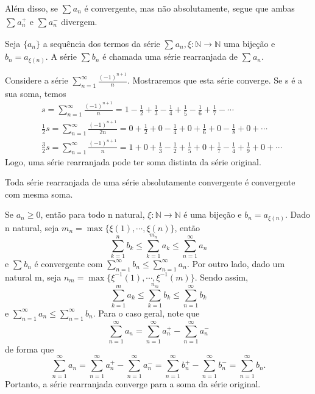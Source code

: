 \documentclass[analysis_notes.tex]{subfiles}
\begin{document}
Al\'em disso, se $\sum\limits_{}^{}a_{n}$ \'e convergente, mas n\~ao absolutamente, segue que ambas $\sum\limits_{}^{}a_{n}^{+}$ e $\sum\limits_{}^{}a_{n}^{-}$ divergem.
\begin{def*}
	Seja $\{a_{n}\}$ a sequ\^encia dos termos da s\'erie $\sum\limits_{}^{}a_{n}, \xi:\mathbb{N}\rightarrow \mathbb{N}$
	uma bije\c c\~ao e $b_{n} = a_{\xi(n)}.$ A s\'erie $\sum\limits_{}^{}b_{n}$ \'e chamada uma s\'erie rearranjada de $\sum\limits_{}^{}a_{n}.$
\end{def*}
\begin{example}
	Considere a s\'erie $\sum\limits_{n=1}^{\infty}\frac{(-1)^{n+1}}{n}$. Mostraremos que esta s\'erie converge. Se s \'e a sua soma, temos
	\begin{align*}
		 & s = \sum\limits_{n=1}^{\infty}\frac{(-1)^{n+1}}{n} = 1 - \frac{1}{2} + \frac{1}{3} - \frac{1}{4} + \frac{1}{5} - \frac{1}{6} + \frac{1}{7} -\cdots                 \\
		 & \frac{1}{2}s = \sum\limits_{n=1}^{\infty}\frac{(-1)^{n+1}}{2n} = 0 + \frac{1}{2} + 0 - \frac{1}{4} + 0 + \frac{1}{6} + 0 - \frac{1}{8} + 0 + \cdots                \\
		 & \frac{3}{2}s = \sum\limits_{n=1}^{\infty}\frac{(-1)^{n+1}}{n} = 1 + 0 + \frac{1}{3} - \frac{1}{2} + \frac{1}{5} + 0 + \frac{1}{7}-\frac{1}{4}+\frac{1}{9}+0+\cdots
	\end{align*}
	Logo, uma s\'erie rearranjada pode ter soma distinta da s\'erie original.
\end{example}
\begin{theorem*}
	Toda s\'erie rearranjada de uma s\'erie absolutamente convergente \'e convergente com mesma soma.
\end{theorem*}
\begin{proof*}
	Se $a_{n}\geq{}0$, ent\~ao para todo n natural, $\xi:\mathbb{N}\rightarrow \mathbb{N}$ \'e uma bije\c c\~ao e $b_{n} = a_{\xi(n)}$.
	Dado n natural, seja $m_{n} = \max{\{\xi(1), \cdots, \xi(n)\}}$, ent\~ao
	$$
		\sum\limits_{k=1}^{n}b_{k} \leq{\sum\limits_{k=1}^{m_{n}}a_{k}\leq{\sum\limits_{n=1}^{\infty}a_{n}}}
	$$
	e $\sum\limits_{}^{}b_{n}$ \'e convergente com $\sum\limits_{n=1}^{\infty}b_{n}\leq{\sum\limits_{n=1}^{\infty}a_{n}}$. Por outro lado,
	dado um natural m, seja $n_{m}=\max{\{\xi^{-1}(1), \cdots, \xi^{-1}(m)\}}$. Sendo assim,
	$$
		\sum\limits_{k=1}^{m}a_{k}\leq{\sum\limits_{k=1}^{n_{m}}b_{k}\leq{\sum\limits_{n=1}^{\infty}b_{k}}}
	$$
	e $\sum\limits_{n=1}^{\infty}a_{n}\leq{\sum\limits_{n=1}^{\infty}b_{n}.}$ Para o caso geral, note que
	$$
		\sum\limits_{n=1}^{\infty}a_{n} = \sum\limits_{n=1}^{\infty}a_{n}^{+} - \sum\limits_{n=1}^{\infty}a_{n}^{-}
	$$
	de forma que
	$$
		\sum\limits_{n=1}^{\infty}a_{n} = \sum\limits_{n=1}^{\infty}a_{n}^{+} - \sum\limits_{n=1}^{\infty}a_{n}^{-} = \sum\limits_{n=1}^{\infty}b_{n}^{+}-\sum\limits_{n=1}^{\infty}b_{n}^{-} = \sum\limits_{n=1}^{\infty}b_{n}.
	$$
	Portanto, a s\'erie rearranjada converge para a soma da s\'erie original. \qedsymbol
\end{proof*}
\end{document}

